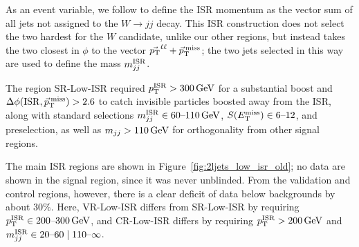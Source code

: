 As an event variable, we follow \cite{atlas_23l_SUSY_2016_24} to define the
ISR momentum as the vector sum of all jets not assigned to the
$W\rightarrow jj$ decay.
This ISR construction does not select the two hardest for the $W$ candidate,
unlike our other regions, but instead takes the two closest in $\phi$ to the
vector $\vec \pt^{\ell\ell} + \ptmiss$;
the two jets selected in this way are used to define the mass $\mwisr$.

The region SR-Low-ISR required $\ptisr > 300\,\eV[G]$ for a substantial
boost and $\dphiisrmet > 2.6$ to catch invisible particles boosted away from the
ISR, along with standard selections $\mwisr \in 60\textrm{--}110\,\eV[G]$,
$\metsig \in 6\textrm{--}12$, and preselection, as well as $\mjj > 110\,\eV[G]$
for orthogonality from other signal regions.

The main ISR regions are shown in Figure~\ref{fig:2ljets_low_isr_old}; no data
are shown in the signal region, since it was never unblinded.
From the validation and control regions, however, there is a clear deficit
of data below backgrounds by about $30\%$.
Here, VR-Low-ISR differs from SR-Low-ISR by requiring
$\ptisr \in 200\textit{--}300\,\eV[G]$, and CR-Low-ISR differs by requiring
$\ptisr > 200\,\eV[G]$ and
$\mwisr \in 20\textrm{--}60 \mid 110\textrm{--}\infty$.

